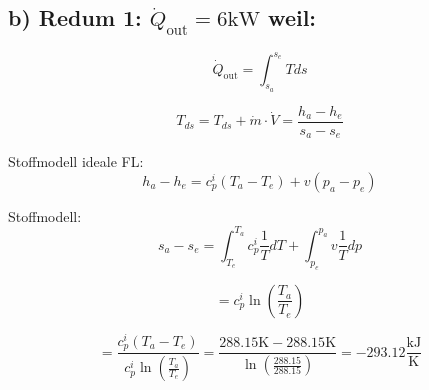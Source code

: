 \subsection*{b) Redum 1: $\dot{Q}_{\text{out}} = 6 \text{kW}$ weil:}

\[
\dot{Q}_{\text{out}} = \int_{s_a}^{s_e} T ds
\]

\[
T_{ds} = T_{ds} + \dot{m} \cdot \dot{V} = \frac{h_a - h_e}{s_a - s_e}
\]

Stoffmodell ideale FL:
\[
h_a - h_e = c_p^i (T_a - T_e) + v (p_a - p_e)
\]

Stoffmodell:
\[
s_a - s_e = \int_{T_e}^{T_a} c_p^i \frac{1}{T} dT + \int_{p_e}^{p_a} v \frac{1}{T} dp
\]

\[
= c_p^i \ln \left( \frac{T_a}{T_e} \right)
\]

\[
= \frac{c_p^i (T_a - T_e)}{c_p^i \ln \left( \frac{T_a}{T_e} \right)} = \frac{288.15 \text{K} - 288.15 \text{K}}{\ln \left( \frac{288.15}{288.15} \right)} = -293.12 \frac{\text{kJ}}{\text{K}}
\]